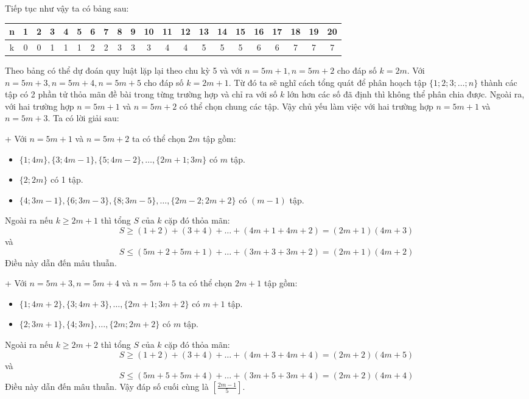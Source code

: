 \begin{bt}
{		Tiếp tục như vậy ta có bảng sau:
		\begin{center}
			\begin{tabular}{|c|c|c|c|c|c|c|c|c|c|c|c|c|c|c|c|c|c|c|c|c|}
				\hline 
				n& 1 & 2 & 3 & 4 & 5 & 6 & 7 & 8 & 9 & 10 & 11 & 12 & 13 & 14 & 15 & 16 & 17 & 18 & 19 & 20 \\
				\hline
				k& 0 & 0 & 1 & 1 & 1 & 2 & 2 & 3 & 3 & 3 & 4 & 4 & 5 & 5 & 5 & 6 & 6 & 7 & 7 & 7\\
				\hline
			\end{tabular}
		\end{center}
		Theo bảng có thể dự đoán quy luật lặp lại theo chu kỳ 5 và với $n=5m+1, n=5m+2$ cho đáp số $k=2m$. Với $n=5m+3, n=5m+4, n=5m+5$ cho đáp số $k=2m+1$. Từ đó ta sẽ nghĩ cách tổng quát để phân hoạch tập $\{1;2;3;\hdots; n\}$ thành các tập có 2 phần tử thỏa mãn đề bài trong từng trường hợp và chỉ ra với số $k$ lớn hơn các số đã định thì không thể phân chia được. Ngoài ra, với hai trường hợp $n=5m+1$ và $n=5m+2$ có thể chọn chung các tập. Vậy chủ yếu làm việc với hai trường hợp $n=5m+1$ và $n=5m+3$. Ta có lời giải sau:
		
		+ Với $n=5m+1$ và $n=5m+2$ ta có thể chọn $2m$ tập gồm:
		\begin{itemize}
			\item $\{1;4m\},\{3;4m-1\},\{5;4m-2\},\hdots,\{2m+1;3m\}$ có $m$ tập.
			\item $\{2;2m\}$ có 1 tập.
			\item $\{4;3m-1\},\{6;3m-3\},\{8;3m-5\},\hdots, \{2m-2;2m+2\}$ có $(m-1)$ tập.
		\end{itemize}
		Ngoài ra nếu $k\geq 2m+1$
		thì tổng $S$ của $k$ cặp đó thỏa mãn:
		$$ S\geq (1+2)+(3+4)+\hdots +(4m+1+4m+2)=(2m+1)(4m+3)$$
		và
		$$ S\leq (5m+2+5m+1)+\hdots +(3m+3+3m+2)=(2m+1)(4m+2)$$ 
		Điều này dẫn đến mâu thuẫn. 
		
		+ Với $n=5m+3, n=5m+4$ và $n=5m+5$ ta có thể chọn $2m+1$ tập gồm:
		\begin{itemize}
			\item $\{1;4m+2\},\{3;4m+3\},\hdots,\{2m+1;3m+2\}$ có $m+1$ tập.
			\item $\{2;3m+1\}, \{4;3m\}, \hdots , \{2m;2m+2\}$ có $m$ tập.
		\end{itemize}
		Ngoài ra nếu $k\geq 2m+2$
		thì tổng $S$ của $k$ cặp đó thỏa mãn:
		$$ S\geq (1+2)+(3+4)+\hdots +(4m+3+4m+4)=(2m+2)(4m+5)$$
		và
		$$ S\leq (5m+5+5m+4)+\hdots +(3m+5+3m+4)=(2m+2)(4m+4)$$ 
		Điều này dẫn đến mâu thuẫn.
		Vậy đáp số cuối cùng là $\left[\frac{2m-1}{5}\right]. $}
\end{bt}

